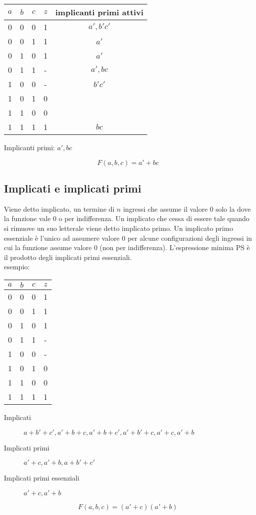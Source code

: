\documentclass{article}
\begin{document}
\begin{center}
\begin{tabular}{ |c|c|c|c|c| }
\hline
$a$ & $b$ & $c$ & $z$ & implicanti primi attivi \\
\hline
\hline
0 & 0 & 0 & 1 & $a', b'c'$ \\
0 & 0 & 1 & 1 & $a'$ \\
0 & 1 & 0 & 1 & $a'$ \\
0 & 1 & 1 & - & $a', bc$ \\
1 & 0 & 0 & - & $b'c'$ \\
1 & 0 & 1 & 0 & \\
1 & 1 & 0 & 0 & \\
1 & 1 & 1 & 1 & $bc$ \\
\hline
\end{tabular}
\end{center}

\noindent
Implicanti primi: $a', bc$

$$
F(a,b,c) = a' + bc
$$

\subsection{Implicati e implicati primi}

Viene detto implicato, un termine di $n$ ingressi che assume il valore 0 solo la dove la funzione vale 0 o per indifferenza.
Un implicato che cessa di essere tale quando si rimuove un suo letterale viene detto implicato primo.
Un implicato primo essenziale è l'unico ad assumere valore 0 per alcune configurazioni degli ingressi in cui la funzione assume valore 0 (non per indifferenza).
L'espressione minima PS è il prodotto degli implicati primi essenziali.\\

\noindent
esempio:

\begin{center}
\begin{tabular}{ |c|c|c|c| }
\hline
$a$ & $b$ & $c$ & $z$ \\
\hline
\hline
0 & 0 & 0 & 1 \\
0 & 0 & 1 & 1 \\
0 & 1 & 0 & 1 \\
0 & 1 & 1 & - \\
1 & 0 & 0 & - \\
1 & 0 & 1 & 0 \\
1 & 1 & 0 & 0 \\
1 & 1 & 1 & 1 \\
\hline
\end{tabular}
\end{center}

\begin{description}
    \item[Implicati] $a+b'+c', a'+b+c, a'+b+c', a'+b'+c, a'+c, a'+b$
    \item[Implicati primi] $a'+c, a'+b, a+b'+c'$
    \item[Implicati primi essenziali] $a'+c, a'+b$
\end{description}

$$
F(a,b,c) = (a'+c)(a'+b)
$$
\end{document}
